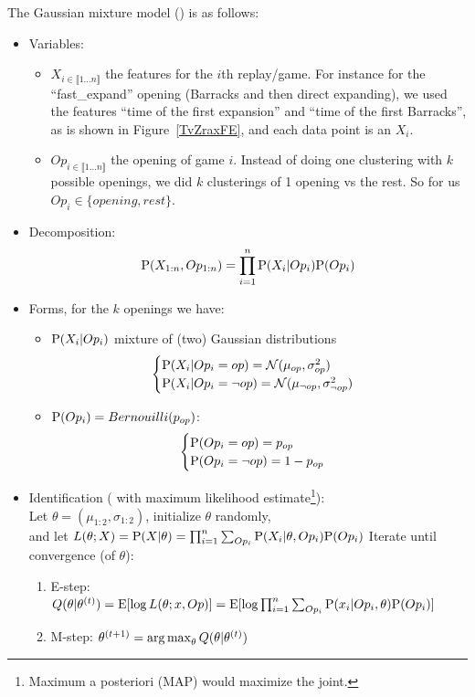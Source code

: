 \label{GMMEM}
The Gaussian mixture model () is as follows:
\begin{itemize}
    \item Variables:
    \begin{itemize}
        \item $X_{i \in \llbracket 1 \dots n\rrbracket}$ the features for the $i$th replay/game. For instance for the ``fast\_expand'' opening (Barracks and then direct expanding), we used the features ``time of the first expansion'' and ``time of the first Barracks'', as is shown in Figure~\ref{TvZraxFE}, and each data point is an $X_i$.
        \item $Op_{i \in \llbracket1 \dots n\rrbracket}$ the opening of game $i$. Instead of doing one clustering with $k$ possible openings, we did $k$ clusterings of 1 opening vs the rest. So for us $Op_i \in \{opening, rest\}$.
    \end{itemize}
    \item Decomposition:
$$\mathrm{P}(X_{1:n}, Op_{1:n}) = \prod_{i=1}^n \mathrm{P}(X_i|Op_i)\mathrm{P}(Op_i)$$
    \item Forms, for the $k$ openings we have:
    \begin{itemize}
        \item $\mathrm{P}(X_i|Op_i)$ mixture of (two) Gaussian distributions
        \begin{eqnarray*}
            \begin{cases} \mathrm{P}(X_i|Op_i=op) = \mathcal{N}(\mu_{op}, \sigma_{op}^2)\\
            \mathrm{P}(X_i|Op_i=\neg op) = \mathcal{N}(\mu_{\neg op}, \sigma_{\neg op}^2) \end{cases} 
        \end{eqnarray*}
        \item $\mathrm{P}(Op_i) = Bernouilli(p_{op})$: 
        \begin{eqnarray*}
            \begin{cases} \mathrm{P}(Op_i=op) = p_{op}\\
            \mathrm{P}(Op_i=\neg op) = 1-p_{op} \end{cases}
        \end{eqnarray*}
    \end{itemize}
    \item Identification ( with maximum likelihood estimate\footnote{Maximum a posteriori (MAP) would maximize the joint.}):\\
    Let $\theta= (\mu_{1:2},\sigma_{1:2})$, initialize $\theta$ randomly, \\
and let $L(\theta;X) = \mathrm{P}(X|\theta) = \prod_{i=1}^n \sum_{Op_i}\mathrm{P}(X_i|\theta,Op_i)\mathrm{P}(Op_i)$
Iterate until convergence (of $\theta$):
    \begin{enumerate}
        \item E-step: $Q(\theta|\theta^{(t)})= \mathrm{E}[\log L(\theta;x,Op)] = \mathrm{E}[\log \prod_{i=1}^n \sum_{Op_i}\mathrm{P}(x_i|Op_i,\theta)\mathrm{P}(Op_i)]$
        \item M-step: $\theta^{(t+1)}=\operatorname*{arg\,max}_{\theta} Q(\theta|\theta^{(t)})$
    \end{enumerate}


\end{itemize}
